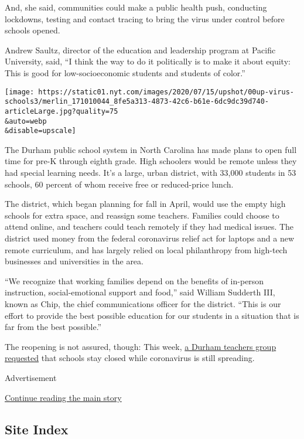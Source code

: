And, she said, communities could make a public health push, conducting
lockdowns, testing and contact tracing to bring the virus under control
before schools opened.

Andrew Saultz, director of the education and leadership program at
Pacific University, said, ``I think the way to do it politically is to
make it about equity: This is good for low-socioeconomic students and
students of color.''

\texttt{[image: https://static01.nyt.com/images/2020/07/15/upshot/00up-virus-schools3/merlin\_171010044\_8fe5a313-4873-42c6-b61e-6dc9dc39d740-articleLarge.jpg?quality=75\\\&auto=webp\\\&disable=upscale]}

The Durham public school system in North Carolina has made plans to open
full time for pre-K through eighth grade. High schoolers would be remote
unless they had special learning needs. It's a large, urban district,
with 33,000 students in 53 schools, 60 percent of whom receive free or
reduced-price lunch.

The district, which began planning for fall in April, would use the
empty high schools for extra space, and reassign some teachers. Families
could choose to attend online, and teachers could teach remotely if they
had medical issues. The district used money from the federal coronavirus
relief act for laptops and a new remote curriculum, and has largely
relied on local philanthropy from high-tech businesses and universities
in the area.

``We recognize that working families depend on the benefits of in-person
instruction, social-emotional support and food,'' said William Sudderth
III, known as Chip, the chief communications officer for the district.
``This is our effort to provide the best possible education for our
students in a situation that is far from the best possible.''

The reopening is not assured, though: This week,
\href{https://daenc.com/2020/07/13/statement-on-school-re-open-plans/}{a
Durham teachers group requested} that schools stay closed while
coronavirus is still spreading.

Advertisement

\protect\hyperlink{after-bottom}{Continue reading the main story}

\hypertarget{site-index}{%
\subsection{Site Index}\label{site-index}}

